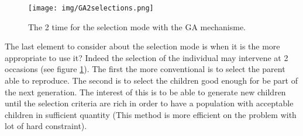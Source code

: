 \begin{figure}[t!]
   \texttt{[image: img/GA2selections.png]}
  \caption{The 2  time for  the selection mode with the GA  mechanisme.}\label{fig:GA2selections}
  \endminipage\hfill
\end{figure}
The last element to consider about the selection mode is when it is the more appropriate to use it? 
Indeed  the selection of the individual may intervene at 2 occasions (see figure \ref{fig:GA2selections}).  The first  the more conventional is  to select the parent  able to reproduce. The second is to select the children good enough for be part of the next generation. The interest of this is to be able to generate new children until the selection criteria are rich in order to have a population with acceptable children in sufficient quantity (This method is more efficient on the problem with lot of hard constraint). 


 

%
%			 

%
%
	


%


